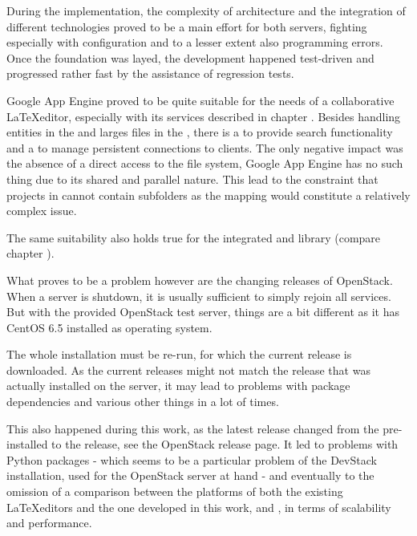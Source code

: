 During the implementation, the complexity of architecture and the integration of different technologies proved to be a main effort for both servers, fighting especially with configuration and to a lesser extent also programming errors. Once the foundation was layed, the development happened test-driven and progressed rather fast by the assistance of regression tests.

Google App Engine proved to be quite suitable for the needs of a collaborative \LaTeX editor, especially with its services described in chapter . Besides handling entities in the  and larges files in the , there is a  to provide search functionality and a  to manage persistent connections to clients. The only negative impact was the absence of a direct access to the file system, Google App Engine has no such thing due to its shared and parallel nature. This lead to the constraint that projects in  cannot contain subfolders as the mapping would constitute a relatively complex issue.

The same suitability also holds true for the integrated  and  library (compare chapter ).

What proves to be a problem however are the changing releases of OpenStack. When a server is shutdown, it is usually sufficient to simply rejoin all services. But with the provided OpenStack test server, things are a bit different as it has CentOS 6.5 installed as operating system.

The whole installation must be re-run, for which the current release is downloaded. As the current releases might not match the release that was actually installed on the server, it may lead to problems with package dependencies and various other things in a lot of times. \cite{website:openstack-releases}

This also happened during this work, as the latest release changed from the pre-installed  to the  release, see the OpenStack release page. \cite{website:openstack-releases} It led to problems with Python packages - which seems to be a particular problem of the DevStack installation, used for the OpenStack server at hand - and eventually to the omission of a comparison between the platforms of both the existing \LaTeX editors and the one developed in this work,  and , in terms of scalability and performance.

